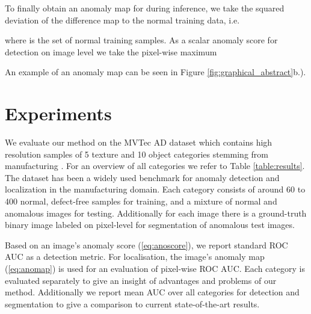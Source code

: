 \documentclass[final,5p,times,twocolumn]{elsarticle}
\begin{document}
	To finally obtain an anomaly map for  during inference, we take the squared deviation of the difference map to the normal training data, i.e.
	
	where  is the set of normal training samples. As a scalar anomaly score for detection on image level we take the pixel-wise maximum
	
	
	An example of an anomaly map can be seen in Figure \ref{fig:graphical_abstract}b.). 
	
	\section{Experiments}
	We evaluate our method on the MVTec AD dataset which contains high resolution samples of 5 texture and 10 object categories stemming from manufacturing \cite{MvtecAd2019}. For an overview of all categories we refer to Table \ref{table:results}. The dataset has been a widely used benchmark for anomaly detection and localization in the manufacturing domain. Each category consists of around 60 to 400 normal, defect-free samples for training, and a mixture of normal and anomalous images for testing. Additionally for each image there is a ground-truth binary image labeled on pixel-level for segmentation of anomalous test images.
	
	Based on an image's anomaly score (\ref{eq:anoscore}), we report standard ROC AUC as a detection metric. For localisation, the image's anomaly map (\ref{eq:anomap}) is used for an evaluation of pixel-wise ROC AUC.
	Each category is evaluated separately to give an insight of advantages and problems of our method. 
	Additionally we report mean AUC over all categories for detection and segmentation to give a comparison to current state-of-the-art results.
	
\end{document}
